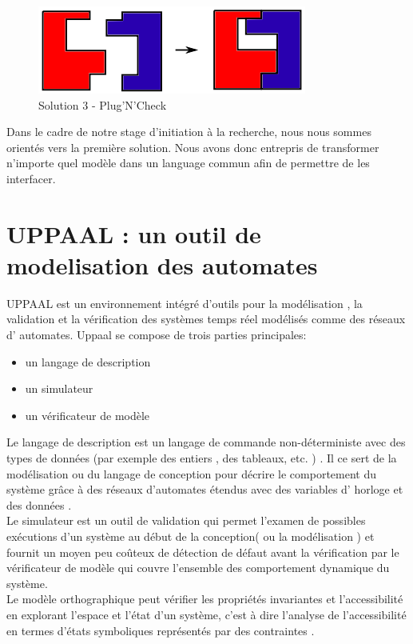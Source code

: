 \documentclass[12pt,a4paper]{report}
\begin{document}
\begin{figure}[h]
	\centering
	\includegraphics[scale=1]{ressources/solution3.png}
	\caption{Solution 3 - Plug'N'Check}
\end{figure}

Dans le cadre de notre stage d'initiation à la recherche, nous nous sommes 
orientés vers la première solution. Nous avons donc entrepris de transformer 
n'importe quel modèle dans un language commun afin de permettre de les 
interfacer.

\newpage
\section{UPPAAL : un outil de modelisation des automates}
UPPAAL est un environnement intégré d'outils pour la modélisation , la validation et la vérification des systèmes temps réel modélisés comme des réseaux d' automates.
Uppaal se compose de trois parties principales: 
\begin{itemize}
  \item{ un langage de description}
  \item{ un simulateur}
  \item{ un vérificateur de modèle}
\end{itemize} 

  Le langage de description est un langage de commande non-déterministe avec des types de données (par exemple des entiers , des tableaux, etc. ) . Il ce sert de la modélisation ou du langage de conception pour décrire le comportement du système grâce à des réseaux d'automates étendus avec des variables d' horloge et des données .\\ 

  Le simulateur est un outil de validation qui permet l'examen de possibles exécutions d'un système au début de la conception( ou la modélisation ) et fournit un moyen peu coûteux de détection de défaut avant la vérification par le vérificateur de modèle qui couvre l'ensemble des comportement dynamique du système.\\

  Le modèle orthographique peut vérifier les propriétés invariantes et l'accessibilité en explorant l'espace et l'état d'un système, c'est à dire l'analyse de l'accessibilité en termes d'états symboliques représentés par des contraintes .
\end{document}
